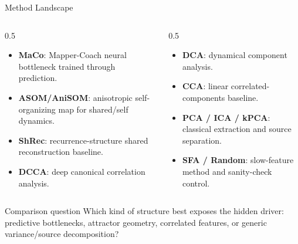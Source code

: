 \documentclass[aspectratio=169,11pt]{beamer}
\begin{document}
\begin{frame}{Method Landscape}
  \begin{columns}[T,onlytextwidth]
    \begin{column}{0.5\textwidth}
      \begin{itemize}
        \item \textbf{MaCo}: Mapper-Coach neural bottleneck trained through prediction.
        \item \textbf{ASOM/AniSOM}: anisotropic self-organizing map for shared/self dynamics.
        \item \textbf{ShRec}: recurrence-structure shared reconstruction baseline.
        \item \textbf{DCCA}: deep canonical correlation analysis.
      \end{itemize}
    \end{column}
    \begin{column}{0.5\textwidth}
      \begin{itemize}
        \item \textbf{DCA}: dynamical component analysis.
        \item \textbf{CCA}: linear correlated-components baseline.
        \item \textbf{PCA / ICA / kPCA}: classical extraction and source separation.
        \item \textbf{SFA / Random}: slow-feature method and sanity-check control.
      \end{itemize}
    \end{column}
  \end{columns}
  \vspace{0.6em}
  \begin{block}{Comparison question}
    Which kind of structure best exposes the hidden driver: predictive bottlenecks, attractor geometry, correlated features, or generic variance/source decomposition?
  \end{block}
\end{frame}
\end{document}
